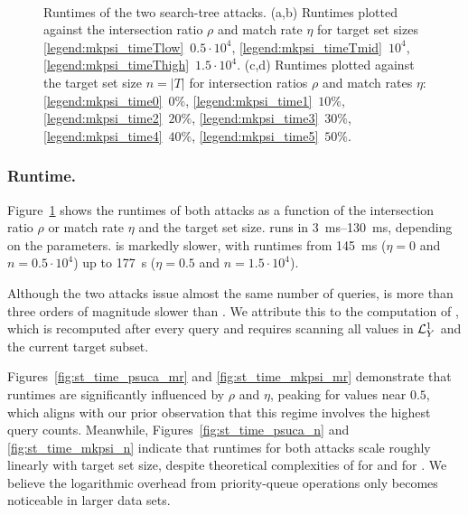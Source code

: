\begin{figure}[t]
  \centering
  \\[-0.4em]
  \caption{Runtimes of the two search-tree attacks.
  (a,b) Runtimes plotted against the intersection ratio $\rho$ and match rate $\eta$ for target set sizes
  \ref{legend:mkpsi_timeTlow}~$0.5\cdot 10^4$,
  \ref{legend:mkpsi_timeTmid}~$10^4$,
  \ref{legend:mkpsi_timeThigh}~$1.5\cdot 10^4$.
  (c,d) Runtimes plotted against the target set size $n = |T|$ for intersection ratios $\rho$ and match rates $\eta$:
  \ref{legend:mkpsi_time0}~$0\%$,
  \ref{legend:mkpsi_time1}~$10\%$,
  \ref{legend:mkpsi_time2}~$20\%$,
  \ref{legend:mkpsi_time3}~$30\%$,
  \ref{legend:mkpsi_time4}~$40\%$,
  \ref{legend:mkpsi_time5}~$50\%$.}
  \label{fig:st_time_all}
\end{figure}


\subsubsection{Runtime.} Figure~\ref{fig:st_time_all} shows the runtimes of both attacks as a function of the intersection ratio $\rho$ or match rate $\eta$ and the target set size.
\PSUCAattack{} runs in \SIrange{3}{130}{\milli\second}, depending on the parameters.
\mkpsiattack{} is markedly slower, with runtimes from \SI{145}{\milli\second} ($\eta = 0$ and $n = 0.5 \cdot 10^4$)
up to \SI{177}{\second} ($\eta = 0.5$ and $n = 1.5 \cdot 10^4$).

Although the two attacks issue almost the same number of queries,
\mkpsiattack{} is more than three orders of magnitude slower than \PSUCAattack. We attribute this to the computation of \colCA{}, which is recomputed after every query and requires scanning all values in $\mathcal{L}^{1}_Y$ and the current target subset.

Figures~\ref{fig:st_time_psuca_mr} and \ref{fig:st_time_mkpsi_mr} demonstrate that runtimes are significantly influenced by $\rho$ and $\eta$, peaking for values near $0.5$, which aligns with our prior observation that this regime involves the highest query counts.
Meanwhile, Figures~\ref{fig:st_time_psuca_n} and \ref{fig:st_time_mkpsi_n} indicate that runtimes for both attacks scale roughly linearly with target set size, despite theoretical complexities of  for \PSUCAattack{} and  for \mkpsiattack. We believe the logarithmic overhead from priority-queue operations only becomes noticeable in larger data sets.

